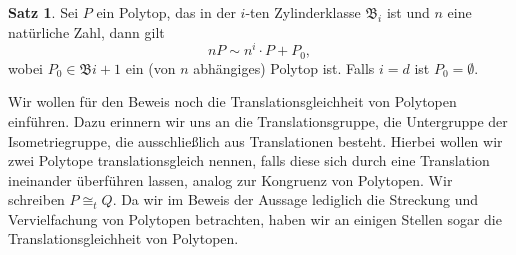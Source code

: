 \documentclass[11pt,titlepage]{article}
\theoremstyle{definition}
\newtheorem{theorem}{Satz}[section]
\theoremstyle{remark}
\begin{document}
	\begin{theorem}\label{thm:hilfssatz}
		Sei $P$ ein Polytop, das in der $i$-ten Zylinderklasse $\mathfrak{B}_i$ ist 
		und $n$ eine natürliche Zahl, dann gilt
		\[nP\sim n^i\cdot P+P_0,\]
		wobei $P_0\in\mathfrak{B}{i+1}$ ein (von $n$ abhängiges) Polytop ist. 
		Falls $i=d$ ist $P_0=\emptyset$.
	\end{theorem}
	
	Wir wollen für den Beweis noch die Translationsgleichheit von Polytopen 
	einführen. Dazu erinnern wir uns an die Translationsgruppe, die 
	Untergruppe der Isometriegruppe, die ausschließlich aus Translationen besteht. 
	Hierbei wollen wir zwei Polytope translationsgleich nennen, falls 
	diese sich durch eine Translation ineinander überführen lassen, analog zur 
	Kongruenz von Polytopen. Wir schreiben $P\cong_t Q$. Da wir im 
	Beweis der Aussage lediglich die Streckung und Vervielfachung von Polytopen 
	betrachten, haben wir an einigen Stellen sogar die Translationsgleichheit 
	von Polytopen.
	
\end{document}

